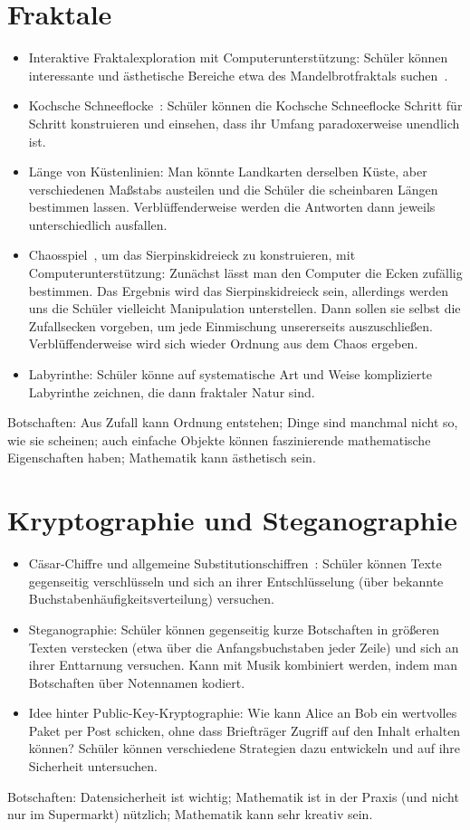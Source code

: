 \documentclass[a4paper,ngerman]{scrartcl}
\begin{document}
\section*{Fraktale}

\begin{itemize}
\item
Interaktive Fraktalexploration mit Computerunterstützung:
Schüler können interessante und ästhetische Bereiche etwa des
Mandelbrotfraktals suchen~\cite{fraktale}.
\item
Kochsche Schneeflocke~\cite{koch}: Schüler können die Kochsche Schneeflocke
Schritt für Schritt konstruieren und einsehen, dass ihr Umfang paradoxerweise
unendlich ist.
\item
Länge von Küstenlinien: Man könnte Landkarten derselben Küste, aber
verschiedenen Maßstabs austeilen und die Schüler die scheinbaren Längen
bestimmen lassen. Verblüffenderweise werden die Antworten dann jeweils
unterschiedlich ausfallen.
\item
Chaosspiel~\cite{chaosspiel}, um das Sierpinskidreieck zu konstruieren, mit
Com\-pu\-ter\-un\-ter\-stüt\-zung: Zunächst lässt man den Computer die Ecken zufällig
bestimmen. Das Ergebnis wird das Sierpinskidreieck sein, allerdings werden
uns die Schüler vielleicht Manipulation unterstellen. Dann sollen sie selbst
die Zufallsecken vorgeben, um jede Einmischung unsererseits auszuschließen.
Verblüffenderweise wird sich wieder Ordnung aus dem Chaos ergeben.
\item Labyrinthe: Schüler könne auf systematische Art und Weise komplizierte
Labyrinthe zeichnen, die dann fraktaler Natur sind.
\end{itemize}
Botschaften: Aus Zufall kann Ordnung entstehen; Dinge sind manchmal nicht so,
wie sie scheinen; auch einfache Objekte können faszinierende mathematische
Eigenschaften haben; Mathematik kann ästhetisch sein.


\section*{Kryptographie und Steganographie}

\begin{itemize}
\item Cäsar-Chiffre und allgemeine Substitutionschiffren~\cite{subst}: Schüler können Texte
gegenseitig verschlüsseln und sich an ihrer Entschlüsselung (über bekannte
Buchstabenhäufigkeitsverteilung) versuchen.
\item Steganographie: Schüler können gegenseitig kurze Botschaften in größeren Texten
verstecken (etwa über die Anfangsbuchstaben jeder Zeile) und sich an ihrer Enttarnung
versuchen. Kann mit Musik kombiniert werden, indem man Botschaften über
Notennamen kodiert.
\item Idee hinter Public-Key-Kryptographie: Wie kann Alice an Bob ein
wertvolles Paket per Post schicken, ohne dass Briefträger Zugriff auf den
Inhalt erhalten können? Schüler können verschiedene Strategien dazu entwickeln
und auf ihre Sicherheit untersuchen.
\end{itemize}
Botschaften: Datensicherheit ist wichtig; Mathematik ist in der Praxis (und
nicht nur im Supermarkt) nützlich; Mathematik kann sehr kreativ sein.
\end{document}
